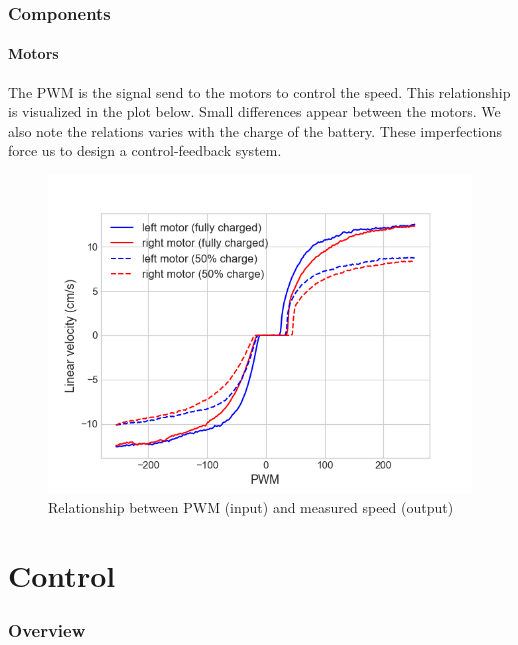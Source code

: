 \documentclass[10pt]{beamer}
\begin{document}
\begin{frame}
\frametitle{Components}
\framesubtitle{Motors}
The PWM is the signal send to the motors to control the speed. This relationship is visualized in the plot below. Small differences appear between the motors. We also note the relations varies with the charge of the battery. These imperfections force us to design a control-feedback system. 
\vspace*{-2mm}
\begin{figure}[hbtp]
\centering
\label{fig:pwm-speed}
\includegraphics[scale=0.45]{figures/motors_merged.png}
\vspace*{-2mm}
\caption{Relationship between PWM (input) and measured speed (output)}
\end{figure}
\end{frame}


\section{Control} 

\begin{frame}
\frametitle{Overview}
\tableofcontents[currentsection,subsectionstyle=shaded]
\end{frame}
\end{document}
